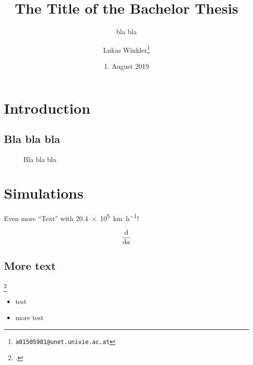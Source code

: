 
\title{The Title of the Bachelor Thesis}
\subtitle{bla bla}
\author{Lukas Winkler\footnote{\texttt{a01505981@unet.univie.ac.at}}}
\date{1. August 2019}

\usepackage{lipsum}  %
\newcommand{\blabla}{Bla bla bla}


	
\maketitle

\tableofcontents

\chapter{Introduction}\label{introduction}

\lipsum[1]

\section{\blabla}

\lipsum[1-2]


\begin{figure}
	\centering
	\caption{\blabla}
	\label{fig:bla}
\end{figure}

\chapter{Simulations}

\lipsum[1-2]

Even more \enquote{Text} with \SI{20.4e5}{\kilo\meter\per\hour}!

\begin{align}
	\dv{a}
\end{align}

\section{More text}

\lipsum[2-5]\footcite{guowhite}



\begin{itemize}
\setlength\itemsep{-0.5em}
\item test
\item more test
\end{itemize}

